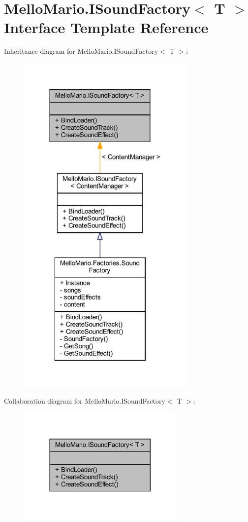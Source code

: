 \section{Mello\+Mario.\+I\+Sound\+Factory$<$ T $>$ Interface Template Reference}
\label{interfaceMelloMario_1_1ISoundFactory}


Inheritance diagram for Mello\+Mario.\+I\+Sound\+Factory$<$ T $>$\+:
\nopagebreak
\begin{figure}[H]
\begin{center}
\leavevmode
\includegraphics[width=250pt]{interfaceMelloMario_1_1ISoundFactory__inherit__graph}
\end{center}
\end{figure}


Collaboration diagram for Mello\+Mario.\+I\+Sound\+Factory$<$ T $>$\+:
\nopagebreak
\begin{figure}[H]
\begin{center}
\leavevmode
\includegraphics[width=233pt]{interfaceMelloMario_1_1ISoundFactory__coll__graph}
\end{center}
\end{figure}

